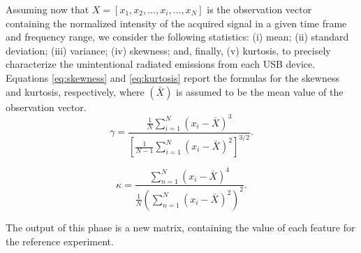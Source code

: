 \documentclass[acmsmall, authorversion]{acmart}
\begin{document}
\begin{itemize}
\begin{itemize}
        Assuming now that $X = [x_1, x_2, ..., x_i, ..., x_N]$ is the observation vector containing the normalized intensity of the acquired signal in a given time frame and frequency range, we consider the following statistics: (i) mean; (ii) standard deviation; (iii) variance; (iv) skewness; and, finally, (v) kurtosis, to precisely characterize the unintentional radiated emissions from each USB device. Equations \ref{eq:skewness} and \ref{eq:kurtosis} report the formulas for the skewness and kurtosis, respectively, where $(\bar{X})$ is assumed to be the mean value of the observation vector.
        \begin{equation}
            \label{eq:skewness}
            \gamma =\frac{\tfrac{1}{N} \sum_{i=1}^N (x_i-\bar{X})^3}{\left[\tfrac{1}{N-1} \sum_{i=1}^N (x_i-\bar{X})^2\right]^{3/2}}.
        \end{equation}
        
        \begin{equation}
            \label{eq:kurtosis}
            \kappa = \frac{\sum_{n=1}^N \left( x_i - \bar{X} \right)^4} {\frac{1}{N} \left( \sum_{n=1}^N \left( x_i - \bar{X} \right)^2 \right)^2  }.
        \end{equation}
        
        The output of this phase is a new matrix, containing the value of each feature for the reference experiment.
    \end{itemize}
    

\end{itemize}
\end{document}
